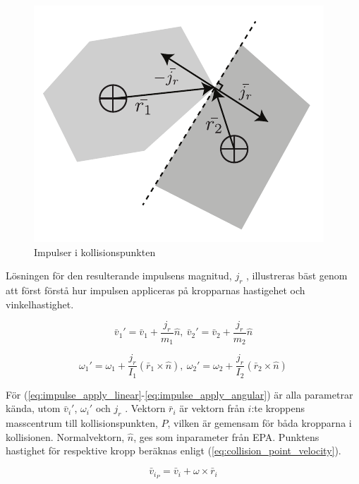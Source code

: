 \documentclass[a4paper,12pt,twopage,swedish]{article}
\begin{document}
\begin{figure}[H]
	\centering
	\includegraphics{illustrations/impulse.pdf}
	\caption{Impulser i kollisionspunkten}
	\label{fig:impulse}
\end{figure}

Lösningen för den resulterande impulsens magnitud, $j_r$ , illustreras bäst genom att först förstå hur impulsen appliceras på kropparnas hastigehet och vinkelhastighet.

\begin{equation}\label{eq:impulse_apply_linear}
\bar{v}_1' = \bar{v}_1 + \frac{j_r}{m_1}\hat{n}, \ \bar{v}_2' = \bar{v}_2 + \frac{j_r}{m_2}\hat{n}
\end{equation}

\begin{equation}\label{eq:impulse_apply_angular}
\omega_1' = \omega_1 + \frac{j_r}{I_1}(\bar{r}_1 \times \hat{n}), \ \omega_2' = \omega_2 + \frac{j_r}{I_2}(\bar{r}_2 \times \hat{n})
\end{equation}

För (\ref{eq:impulse_apply_linear}-\ref{eq:impulse_apply_angular}) är alla parametrar kända, utom $\bar{v}_i'$, $\omega_i'$ och $j_r$ . Vektorn $\bar{r}_i$ är vektorn från $i$:te kroppens masscentrum till kollisionspunkten, $P$, vilken är gemensam för båda kropparna i kollisionen. Normalvektorn, $\hat{n}$, ges som inparameter från EPA. Punktens hastighet för respektive kropp beräknas enligt (\ref{eq:collision_point_velocity}).

\begin{equation}\label{eq:collision_point_velocity}
\bar{v}_{i_P} = \bar{v}_i + \omega \times \bar{r}_i
\end{equation}
\end{document}
